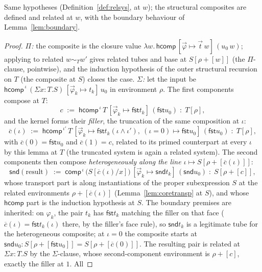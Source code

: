 \documentclass{lmcs}
\newcommand{\hcomp}{\mathsf{hcomp}}
\newcommand{\vcomp}{\mathsf{comp}}
\providecommand{\fst}{}\renewcommand{\fst}{\mathsf{fst}}
\providecommand{\snd}{}\renewcommand{\snd}{\mathsf{snd}}
\begin{document}
\begin{lem}[$\hcomp$ at $\Pi$, $\Sigma$, $\mathsf{PathP}$]
  \label{lem:corehcompstr}
  Same hypotheses (Definition~\ref{def:relsys}, at $w$); the
  structural composites are defined and related at $w$, with the
  boundary behaviour of Lemma~\ref{lem:boundary}.
\end{lem}
\begin{proof}
  \emph{$\Pi$:} the composite is the closure value
  $\lambda w.\,\hcomp\,[\vec\varphi \mapsto \vec t\,w]\,(u_0\,w)$;
  applying to related $w \sim_T w'$ gives related tubes and base at
  $S[\rho{+}[w]]$ (the $\Pi$-clause, pointwise), and the induction
  hypothesis of the outer structural recursion on $T$ (the
  composite at $S$) closes the case.
  \emph{$\Sigma$:} let the input be
  $\hcomp^{\,\iota}\,(\Sigma x{:}T.S)\,
  [\vec\varphi_k \mapsto t_k]\,u_0$ in environment $\rho$.  The
  first components compose at $T$:
  \[
    c \;:=\; \hcomp^{\,\iota}\,T\,
      [\vec\varphi_k \mapsto \fst t_k]\,(\fst u_0)
    \;:\; T[\rho],
  \]
  and the kernel forms their \emph{filler}, the truncation of the
  same composition at $\iota$:
  \[
    \overline{c}(\iota) \;:=\; \hcomp^{\,\iota'}\,T\,
      [\vec\varphi_k \mapsto \fst t_k(\iota \wedge \iota'),\
       (\iota{=}0) \mapsto \fst u_0]\,(\fst u_0)
    \;:\; T[\rho],
  \]
  with $\overline{c}(0) = \fst u_0$ and $\overline{c}(1) = c$,
  related to its primed counterpart at every $\iota$ by this lemma
  at $T$ (the truncated system is again a related system).  The
  second components then compose \emph{heterogeneously along the
  line $\iota \mapsto S[\rho{+}[\overline{c}(\iota)]]$}:
  \[
    \snd(\text{result}) \;:=\;
    \vcomp^{\,\iota}\,\bigl(S[\overline{c}(\iota)/x]\bigr)\,
      [\vec\varphi_k \mapsto \snd t_k]\,(\snd u_0)
    \;:\; S[\rho{+}[c]],
  \]
  whose transport part is along instantiations of the proper
  subexpression $S$ at the related environments
  $\rho{+}[\overline{c}(\iota)]$ (Lemma~\ref{lem:coretransp} at
  $S$), and whose $\hcomp$ part is the induction hypothesis at $S$.
  The boundary premises are inherited: on $\varphi_k$, the pair
  $t_k$ has $\fst t_k$ matching the filler on that face
  ($\overline{c}(\iota) = \fst t_k(\iota)$ there, by the filler's
  face rule), so $\snd t_k$ is a legitimate tube for the
  heterogeneous composite; at $\iota = 0$ the composite starts at
  $\snd u_0 : S[\rho{+}[\fst u_0]] =
  S[\rho{+}[\overline{c}(0)]]$.  The resulting pair is related at
  $\Sigma x{:}T.S$ by the $\Sigma$-clause, whose second-component
  environment is $\rho{+}[c]$, exactly the filler at $1$.  All

\end{proof}
\end{document}
